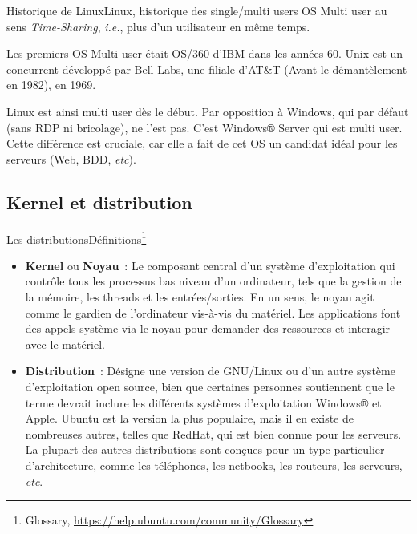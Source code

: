 \documentclass{beamer}
\begin{document}
    \begin{frame}{Historique de Linux}{Linux, historique des single/multi users OS}
        Multi user au sens \textit{Time-Sharing}, \textit{i.e.}, plus d'un utilisateur en même temps.

        Les premiers OS Multi user était OS/360 d'IBM dans les années 60.
        Unix est un concurrent développé par Bell Labs, une filiale d'AT\&T (Avant le démantèlement en 1982), en 1969.

        Linux est ainsi multi user dès le début.
        Par opposition à Windows, qui par défaut (sans RDP ni bricolage), ne l'est pas.
        C'est Windows® Server qui est multi user.
        \bigbreak
        Cette différence est cruciale, car elle a fait de cet OS un candidat idéal pour les serveurs (Web, BDD, \textit{etc}).
    \end{frame}

    \subsection{Kernel et distribution}\label{subsec:kernel-et-distribution}

    \begin{frame}{Les distributions}{Définitions\footnote{Glossary, \url{https://help.ubuntu.com/community/Glossary}}}
        \begin{itemize}
            \item \textbf{Kernel} ou \textbf{Noyau}~: Le composant central d'un système d'exploitation qui contrôle tous les processus bas niveau d'un ordinateur, tels que la gestion de la mémoire, les threads et les entrées/sorties.
            En un sens, le noyau agit comme le gardien de l'ordinateur vis-à-vis du matériel.
            Les applications font des appels système via le noyau pour demander des ressources et interagir avec le matériel.
            \item \textbf{Distribution}~: Désigne une version de GNU/Linux ou d'un autre système d'exploitation open source, bien que certaines personnes soutiennent que le terme devrait inclure les différents systèmes d'exploitation Windows® et Apple.
            Ubuntu est la version la plus populaire, mais il en existe de nombreuses autres, telles que RedHat, qui est bien connue pour les serveurs.
            La plupart des autres distributions sont conçues pour un type particulier d'architecture, comme les téléphones, les netbooks, les routeurs, les serveurs, \textit{etc}.
        \end{itemize}
    \end{frame}
\end{document}
